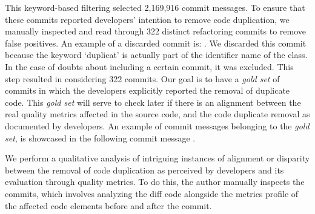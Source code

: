 This keyword-based filtering selected 2,169,916 commit messages. %
To ensure that these commits reported developers' intention to remove code duplication, we manually inspected and read through 322 distinct refactoring commits to remove false positives. An example of a discarded commit is: . We discarded this commit because the keyword `duplicat' is actually part of the identifier name of the class. In the case of doubts about including a certain commit, it was excluded. This step resulted in considering 322 commits. Our goal is to have a \textit{gold set} of commits in which the developers explicitly reported the removal of duplicate code. This \textit{gold set} will serve to check later if there is an alignment between the real quality metrics affected in the source code, and the code duplicate removal as documented by developers. 
 An example of commit messages belonging to the \textit{gold set}, is showcased in the following commit message  . %


We perform a qualitative analysis of intriguing instances of alignment or disparity between the removal of code duplication as perceived by developers and its evaluation through quality metrics. To do this, the author manually inspects the commits, which involves analyzing the diff code alongside the metrics profile of the affected code elements before and after the commit.

